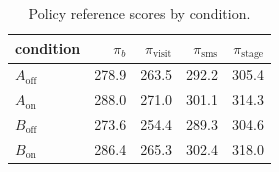 \begin{table}[!htbp]
\centering
\caption{Policy reference scores by condition.}
\label{tab:campaignvalues}
\small
\begin{tabular}{lrrrr}
\toprule
condition & $\pi_b$ & $\pi_{\mathrm{visit}}$ & $\pi_{\mathrm{sms}}$ & $\pi_{\mathrm{stage}}$ \\
\midrule
$A_{\mathrm{off}}$ & 278.9 & 263.5 & 292.2 & 305.4 \\
$A_{\mathrm{on}}$ & 288.0 & 271.0 & 301.1 & 314.3 \\
$B_{\mathrm{off}}$ & 273.6 & 254.4 & 289.3 & 304.6 \\
$B_{\mathrm{on}}$ & 286.4 & 265.3 & 302.4 & 318.0 \\
\bottomrule
\end{tabular}
\end{table}
